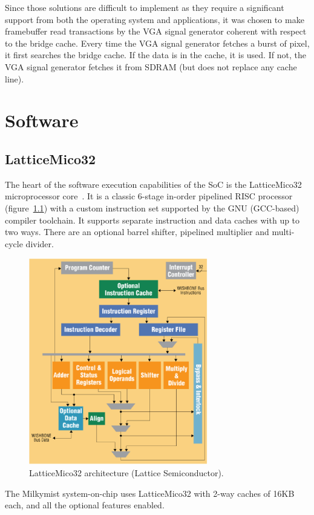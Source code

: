 \documentclass[a4paper,11pt]{kthesis}
\begin{document}
Since those solutions are difficult to implement as they require a significant support from both the operating system and applications, it was chosen to make framebuffer read transactions by the VGA signal generator coherent with respect to the bridge cache. Every time the VGA signal generator fetches a burst of pixel, it first searches the bridge cache. If the data is in the cache, it is used. If not, the VGA signal generator fetches it from SDRAM (but does not replace any cache line).

\chapter{Software}
\section{LatticeMico32}
The heart of the software execution capabilities of the SoC is the LatticeMico32 microprocessor core~\cite{mico32}. It is a classic 6-stage in-order pipelined RISC processor (figure~\ref{fig:lm32arch}) with a custom instruction set supported by the GNU (GCC-based) compiler toolchain. It supports separate instruction and data caches with up to two ways. There are an optional barrel shifter, pipelined multiplier and multi-cycle divider.

\begin{figure}[htp]
\centering
\includegraphics[height=90mm]{lm32arch.eps}
\caption{LatticeMico32 architecture (Lattice Semiconductor).}
\label{fig:lm32arch}
\end{figure}

The Milkymist system-on-chip uses LatticeMico32 with 2-way caches of 16KB each, and all the optional features enabled.
\end{document}

